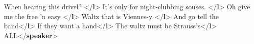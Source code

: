 \begin{shaded}
\hspace*{1em}\hspace*{1em}When hearing this drivel? {</\textbf{l}>}\mbox{}\newline 
\hspace*{1em}\hspace*{1em}It's only for night-clubbing souses. {</\textbf{l}>}\mbox{}\newline 
\hspace*{1em}\hspace*{1em}Oh give me the free 'n easy {</\textbf{l}>}\mbox{}\newline 
\hspace*{1em}\hspace*{1em}Waltz that is Viennes-y {</\textbf{l}>}\mbox{}\newline 
\hspace*{1em}\hspace*{1em}And go tell the band{</\textbf{l}>}\mbox{}\newline 
\hspace*{1em}\hspace*{1em}If they want a hand{</\textbf{l}>}\mbox{}\newline 
\hspace*{1em}\hspace*{1em}The waltz must be Strauss's{</\textbf{l}>}\mbox{}\newline 
\hspace*{1em}\mbox{}\newline 
{}\mbox{}\newline 
{}\mbox{}\newline 
\hspace*{1em}ALL{</\textbf{speaker}>}\mbox{}\newline 
\hspace*{1em}\mbox{}\newline 

\end{shaded}

